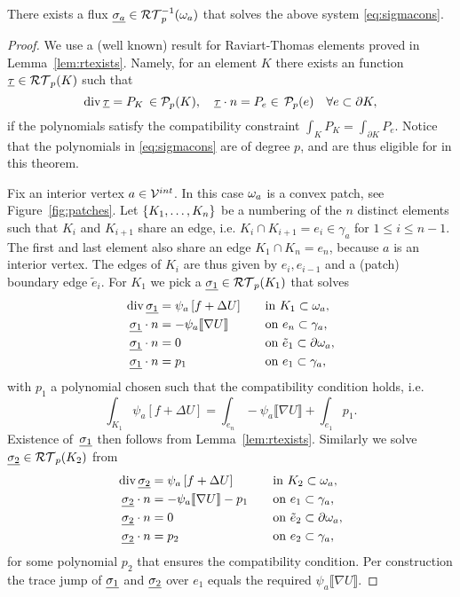 \documentclass[thesis.tex]{subfiles}
\begin{document}
\begin{thm}
  \label{thm:sigmasolvable}
  There exists a flux $\underline{\sigma_a} \in \mathcal{RT}_{p}^{-1}(\omega_a)$ that solves the above system \eqref{eq:sigmacons}.
\end{thm}
\begin{proof}
  We use a (well known) result for Raviart-Thomas elements proved in Lemma~\ref{lem:rtexists}. Namely, 
  for an element $K$ there exists an function $\underline{\tau} \in \mathcal{RT}_p(K)$ such that
  \[
    \operatorname{div} \underline{\tau} = P_K \, \in \mathcal{P}_p(K), \quad \underline{\tau} \cdot n = P_e \in \,\mathcal{P}_p(e) \quad \forall e \subset \partial K,
  \]
  if the polynomials satisfy the compatibility constraint $\int_K P_K = \int_{\partial K} P_e$.
  Notice that the polynomials in \eqref{eq:sigmacons} are of degree $p$, and are thus eligible for in this theorem.

  Fix an interior vertex $a \in \mathcal{V}^{int}$. In this case $\omega_a$ is a convex patch, see Figure~\ref{fig:patches}. Let $\set{K_1,\dots,K_n}$ be a numbering
  of the $n$ distinct elements such that $K_i$ and $K_{i+1}$ share an edge, 
  i.e. $K_i \cap K_{i+1} =e_i \in \gamma_a$ for $1 \leq i \leq n-1$. The first and last element also share an edge $K_1 \cap K_n = e_n$,
  because $a$ is an interior vertex. The edges of $K_i$ are thus given by $e_i, e_{i-1}$ and a (patch) boundary edge $\tilde e_i$. 
  For $K_1$ we pick a $\underline{\sigma_1}\in \mathcal{RT}_p(K_1)$ that solves 
  \begin{alignat*}{3}
    \operatorname{div} \underline{\sigma_1} &= \psi_a \left [f + \Delta U\right] && \quad\text{in }  K_1\subset \omega_a ,\\
    \underline{\sigma_1} \cdot n  &=-\psi_a \llbracket \nabla U \rrbracket && \quad \text{on } e_n \subset \gamma_a,\\
    \underline{\sigma_1} \cdot n  &= 0 && \quad \text{on } \tilde e_1 \subset \partial \omega_a,\\
    \underline{\sigma_1} \cdot n  &= p_1 && \quad \text{on } e_{1} \subset \gamma_a,
  \end{alignat*}
  with $p_1$ a polynomial chosen such that the compatibility condition holds, i.e.
  \[
    \int_{K_1} \psi_a \left[ f + \Delta U\right] = \int_{e_n} - \psi_a \llbracket \nabla U \rrbracket + \int_{e_1} p_1.
  \]  
  Existence of~$\underline{\sigma_1}$
  then follows from Lemma~\ref{lem:rtexists}. Similarly we solve $\underline{\sigma_2} \in \mathcal{RT}_p(K_2)$ from
  \begin{alignat*}{3}
    \operatorname{div} \underline{\sigma_2} &= \psi_a \left [f + \Delta U\right] && \quad\text{in }  K_2\subset \omega_a ,\\
     \underline{\sigma_2} \cdot n  &= -\psi_a \llbracket \nabla U \rrbracket - p_1 && \quad \text{on } e_1 \subset \gamma_a,\\
    \underline{\sigma_2} \cdot n  &= 0 && \quad \text{on } \tilde e_2 \subset \partial \omega_a,\\
    \underline{\sigma_2} \cdot n  &= p_2 && \quad \text{on } e_{2} \subset \gamma_a,
  \end{alignat*}
  for some polynomial $p_2$ that ensures the compatibility condition. Per construction the trace jump of $\underline{\sigma_1}$ and $\underline{\sigma_2}$ over
  $e_1$ equals the required $\psi_a \llbracket \nabla U \rrbracket$.
  

\end{proof}
\end{document}
